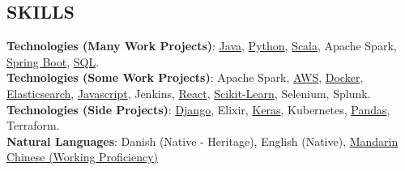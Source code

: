\documentclass[margin]{res}
\begin{document}
\begin{resume}




\section{SKILLS}

\textbf{Technologies (Many Work Projects)}:
\href{https://www.lucaskjaerozhang.com/technology/java/}{Java},
\href{https://www.lucaskjaerozhang.com/technology/python/}{Python},
\href{https://www.lucaskjaerozhang.com/technology/scala/}{Scala},
Apache Spark,
\href{https://www.lucaskjaerozhang.com/technology/spring-boot/}{Spring Boot},
\href{https://www.lucaskjaerozhang.com/technology/sql/}{SQL}.
\\
\textbf{Technologies (Some Work Projects)}:
Apache Spark,
\href{https://www.lucaskjaerozhang.com/technology/aws/}{AWS},
\href{https://www.lucaskjaerozhang.com/technology/docker/}{Docker},
\href{https://www.lucaskjaerozhang.com/technology/elasticsearch/}{Elasticsearch},
\href{https://www.lucaskjaerozhang.com/technology/javascript/}{Javascript},
Jenkins,
\href{https://www.lucaskjaerozhang.com/technology/react/}{React},
\href{https://www.lucaskjaerozhang.com/technology/sklearn/}{Scikit-Learn},
Selenium,
Splunk.
\\
\textbf{Technologies (Side Projects)}:
\href{https://www.lucaskjaerozhang.com/technology/django/}{Django},
Elixir,
\href{https://www.lucaskjaerozhang.com/technology/keras/}{Keras},
Kubernetes,
\href{https://www.lucaskjaerozhang.com/technology/pandas/}{Pandas},
Terraform.
\\
\textbf{Natural Languages}: Danish (Native - Heritage), English (Native), \href{https://www.lucaskjaerozhang.com/lucas-kjaero-zhang-%E4%B8%AA%E4%BA%BA%E7%AE%80%E5%8E%86.pdf}{Mandarin Chinese (Working Proficiency)}


\end{resume}
\end{document}
